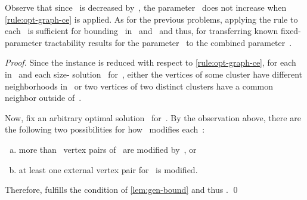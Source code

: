\documentclass[envcountsame,numbook,smallextended]{svjour3}
\numberwithin{equation}{section}
\numberwithin{figure}{section}
\newcommand{\CEGP}{\textsc{Cluster Editing with  Cost- Packing}}
\begin{document}
\noindent Observe that since~ is decreased by~, the parameter~ does not increase when \cref{rule:opt-graph-ce} is applied. As for the previous problems, applying the rule to each~ is sufficient for bounding~ in~ and~ and thus, for transferring known fixed-parameter tractability results for the parameter~ to the combined parameter~.

\begin{proof}
  Since the instance is reduced
  with respect to \cref{rule:opt-graph-ce},
  for each~ in~ and
  each size- solution~ for~,
  either the vertices of some cluster
  have different neighborhoods in~
  or two vertices of two distinct clusters
  have a common neighbor outside of~. 

  Now,
  fix an arbitrary optimal solution~ for~.
  By the observation above,
  there are the following two possibilities
  for how ~modifies each~:
  \begin{enumerate}[(a)]
  \item\label{ce-inside} more than~ vertex pairs of~ are modified by~, or
  \item\label{ce-outside} at least one external vertex pair for~ is modified.
  \end{enumerate}
Therefore,  fulfills the condition of \cref{lem:gen-bound} and thus .
\qed\end{proof}
\end{document}
